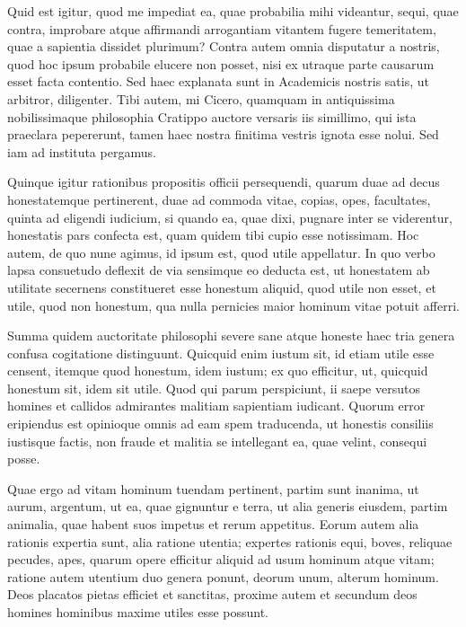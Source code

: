  Quid est igitur, quod me impediat ea, quae probabilia mihi videantur, sequi, quae contra, improbare atque affirmandi arrogantiam vitantem fugere temeritatem, quae a sapientia dissidet plurimum? Contra autem omnia disputatur a nostris, quod hoc ipsum probabile elucere non posset, nisi ex utraque parte causarum esset facta contentio. Sed haec explanata sunt in Academicis nostris satis, ut arbitror, diligenter. Tibi autem, mi Cicero, quamquam in antiquissima nobilissimaque philosophia Cratippo auctore versaris iis simillimo, qui ista praeclara pepererunt, tamen haec nostra finitima vestris ignota esse nolui. Sed iam ad instituta pergamus.

 Quinque igitur rationibus propositis officii persequendi, quarum duae ad decus honestatemque pertinerent, duae ad commoda vitae, copias, opes, facultates, quinta ad eligendi iudicium, si quando ea, quae dixi, pugnare inter se viderentur, honestatis pars confecta est, quam quidem tibi cupio esse notissimam. Hoc autem, de quo nune agimus, id ipsum est, quod utile appellatur. In quo verbo lapsa consuetudo deflexit de via sensimque eo deducta est, ut honestatem ab utilitate secernens constitueret esse honestum aliquid, quod utile non esset, et utile, quod non honestum, qua nulla pernicies maior hominum vitae potuit afferri.

 Summa quidem auctoritate philosophi severe sane atque honeste haec tria genera confusa cogitatione distinguunt. Quicquid enim iustum sit, id etiam utile esse censent, itemque quod honestum, idem iustum; ex quo efficitur, ut, quicquid honestum sit, idem sit utile. Quod qui parum perspiciunt, ii saepe versutos homines et callidos admirantes malitiam sapientiam iudicant. Quorum error eripiendus est opinioque omnis ad eam spem traducenda, ut honestis consiliis iustisque factis, non fraude et malitia se intellegant ea, quae velint, consequi posse.

 Quae ergo ad vitam hominum tuendam pertinent, partim sunt inanima, ut aurum, argentum, ut ea, quae gignuntur e terra, ut alia generis eiusdem, partim animalia, quae habent suos impetus et rerum appetitus. Eorum autem alia rationis expertia sunt, alia ratione utentia; expertes rationis equi, boves, reliquae pecudes, apes, quarum opere efficitur aliquid ad usum hominum atque vitam; ratione autem utentium duo genera ponunt, deorum unum, alterum hominum. Deos placatos pietas efficiet et sanctitas, proxime autem et secundum deos homines hominibus maxime utiles esse possunt.

